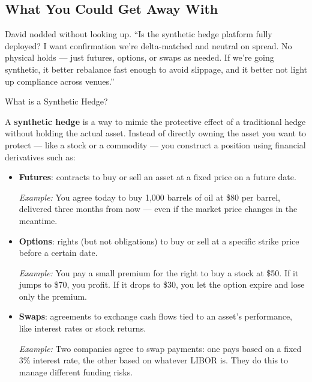 
\subsection{What You Could Get Away With}


David nodded without looking up.
``Is the synthetic hedge platform fully deployed? I want confirmation we’re delta-matched and 
neutral on spread. No physical holds — just futures, options, or swaps as needed. If we’re going 
synthetic, it better rebalance fast enough to avoid slippage, and it better not light up 
compliance across venues.''

\medskip

\begin{TechnicalSidebar}{What is a Synthetic Hedge?}

  A \textbf{synthetic hedge} is a way to mimic the protective effect of a traditional hedge without 
  holding the actual asset.  
  Instead of directly owning the asset you want to protect --- like a stock or a commodity --- you 
  construct a position using financial derivatives such as:

  \medskip

  \begin{itemize}
    \item \textbf{Futures}: contracts to buy or sell an asset at a fixed price on a future date.  

    \medskip

    \textit{Example:} You agree today to buy 1,000 barrels of oil at \$80 per barrel, delivered three months from now — even if the market price changes in the meantime.

    \medskip
  
    \item \textbf{Options}: rights (but not obligations) to buy or sell at a specific strike price before a certain date.  

    \medskip

    \textit{Example:} You pay a small premium for the right to buy a stock at \$50. If it jumps to \$70, you profit. If it drops to \$30, you let the option expire and lose only the premium.

    \medskip
  
    \item \textbf{Swaps}: agreements to exchange cash flows tied to an asset’s performance, like interest rates or stock returns.  

    \medskip

    \textit{Example:} Two companies agree to swap payments: one pays based on a fixed 3\% interest rate, the other based on whatever LIBOR is. They do this to manage different funding risks.
  \end{itemize}
  


\end{TechnicalSidebar}
